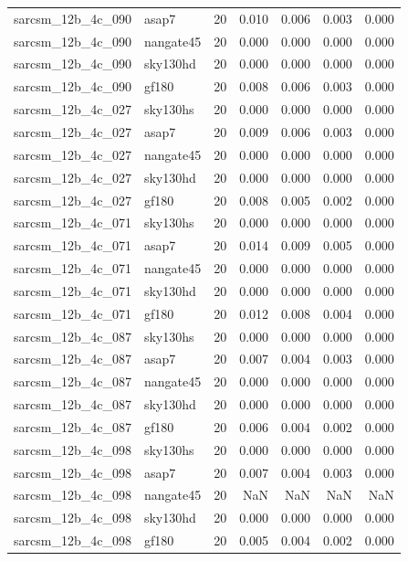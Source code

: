 \begin{tabular}{llrrrrr}
sarcsm\_12b\_4c\_090 & asap7 & 20 & 0.010 & 0.006 & 0.003 & 0.000 \\
sarcsm\_12b\_4c\_090 & nangate45 & 20 & 0.000 & 0.000 & 0.000 & 0.000 \\
sarcsm\_12b\_4c\_090 & sky130hd & 20 & 0.000 & 0.000 & 0.000 & 0.000 \\
sarcsm\_12b\_4c\_090 & gf180 & 20 & 0.008 & 0.006 & 0.003 & 0.000 \\
sarcsm\_12b\_4c\_027 & sky130hs & 20 & 0.000 & 0.000 & 0.000 & 0.000 \\
sarcsm\_12b\_4c\_027 & asap7 & 20 & 0.009 & 0.006 & 0.003 & 0.000 \\
sarcsm\_12b\_4c\_027 & nangate45 & 20 & 0.000 & 0.000 & 0.000 & 0.000 \\
sarcsm\_12b\_4c\_027 & sky130hd & 20 & 0.000 & 0.000 & 0.000 & 0.000 \\
sarcsm\_12b\_4c\_027 & gf180 & 20 & 0.008 & 0.005 & 0.002 & 0.000 \\
sarcsm\_12b\_4c\_071 & sky130hs & 20 & 0.000 & 0.000 & 0.000 & 0.000 \\
sarcsm\_12b\_4c\_071 & asap7 & 20 & 0.014 & 0.009 & 0.005 & 0.000 \\
sarcsm\_12b\_4c\_071 & nangate45 & 20 & 0.000 & 0.000 & 0.000 & 0.000 \\
sarcsm\_12b\_4c\_071 & sky130hd & 20 & 0.000 & 0.000 & 0.000 & 0.000 \\
sarcsm\_12b\_4c\_071 & gf180 & 20 & 0.012 & 0.008 & 0.004 & 0.000 \\
sarcsm\_12b\_4c\_087 & sky130hs & 20 & 0.000 & 0.000 & 0.000 & 0.000 \\
sarcsm\_12b\_4c\_087 & asap7 & 20 & 0.007 & 0.004 & 0.003 & 0.000 \\
sarcsm\_12b\_4c\_087 & nangate45 & 20 & 0.000 & 0.000 & 0.000 & 0.000 \\
sarcsm\_12b\_4c\_087 & sky130hd & 20 & 0.000 & 0.000 & 0.000 & 0.000 \\
sarcsm\_12b\_4c\_087 & gf180 & 20 & 0.006 & 0.004 & 0.002 & 0.000 \\
sarcsm\_12b\_4c\_098 & sky130hs & 20 & 0.000 & 0.000 & 0.000 & 0.000 \\
sarcsm\_12b\_4c\_098 & asap7 & 20 & 0.007 & 0.004 & 0.003 & 0.000 \\
sarcsm\_12b\_4c\_098 & nangate45 & 20 & NaN & NaN & NaN & NaN \\
sarcsm\_12b\_4c\_098 & sky130hd & 20 & 0.000 & 0.000 & 0.000 & 0.000 \\
sarcsm\_12b\_4c\_098 & gf180 & 20 & 0.005 & 0.004 & 0.002 & 0.000 \\

\end{tabular}

